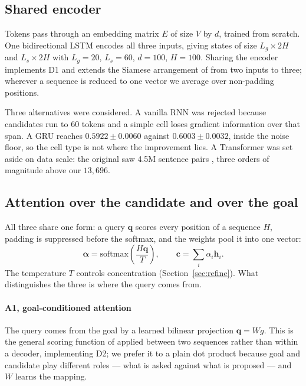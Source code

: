 \documentclass[11pt]{article}
\begin{document}
\subsection{Shared encoder}
\label{sec:encoder}

Tokens pass through an embedding matrix $E$ of size $V$ by $d$, trained from
scratch. One bidirectional LSTM \citep{hochreiter1997lstm} encodes all three
inputs, giving states of size $L_g \times 2H$ and $L_s \times 2H$ with
$L_g = 20$, $L_s = 60$, $d = 100$, $H = 100$. Sharing the encoder implements
D1 and extends the Siamese arrangement of \citet{mueller2016siamese} from two
inputs to three; wherever a sequence is reduced to one vector we average over
non-padding positions.

Three alternatives were considered. A vanilla RNN was rejected because
candidates run to 60 tokens and a simple cell loses gradient information over
that span. A GRU reaches $0.5922 \pm 0.0060$ against $0.6003 \pm 0.0032$,
inside the noise floor, so the cell type is not where the improvement lies. A
Transformer was set aside on data scale: the original saw 4.5M sentence pairs
\citep{vaswani2017attention}, three orders of magnitude above our
$13{,}696$.

\subsection{Attention over the candidate and over the goal}
\label{sec:attn}

All three share one form: a query $\mathbf{q}$ scores every position of a
sequence $H$, padding is suppressed before the softmax, and the weights pool
it into one vector:
\begin{equation}
\boldsymbol{\alpha} = \mathrm{softmax}\!\left(\frac{H\mathbf{q}}{T}\right),
\qquad
\mathbf{c} = \sum_i \alpha_i \mathbf{h}_i .
\label{eq:attn}
\end{equation}
The temperature $T$ controls concentration (Section~\ref{sec:refine}). What
distinguishes the three is where the query comes from.

\paragraph{A1, goal-conditioned attention}
The query comes from the goal by a learned bilinear projection
$\mathbf{q} = Wg$. This is the general scoring function of
\citet{luong2015attention} applied between two sequences rather than within a
decoder, implementing D2; we prefer it to a plain dot product because goal
and candidate play different roles --- what is asked against what is proposed
--- and $W$ learns the mapping.
\end{document}
